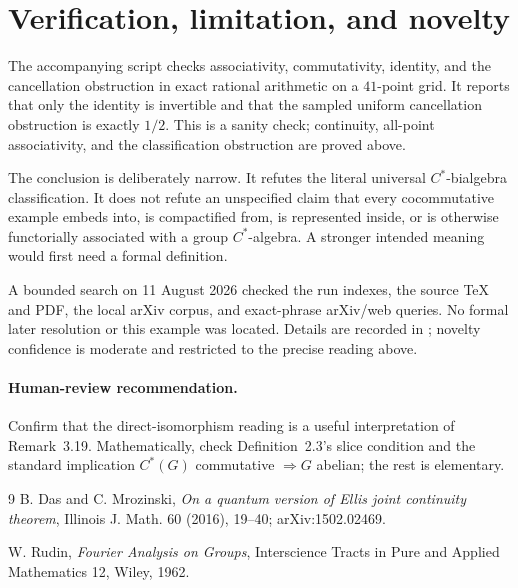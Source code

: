 \documentclass[11pt]{article}
\begin{document}
\section{Verification, limitation, and novelty}

The accompanying script  checks
associativity, commutativity, identity, and the cancellation obstruction in
exact rational arithmetic on a $41$-point grid.  It reports that only the
identity is invertible and that the sampled uniform cancellation obstruction
is exactly $1/2$.  This is a sanity check; continuity, all-point associativity,
and the classification obstruction are proved above.

The conclusion is deliberately narrow.  It refutes the literal universal
$C^*$-bialgebra classification.  It does not refute an unspecified claim that
every cocommutative example embeds into, is compactified from, is represented
inside, or is otherwise functorially associated with a group $C^*$-algebra.
A stronger intended meaning would first need a formal definition.

A bounded search on 11 August 2026 checked the run indexes, the source TeX and
PDF, the local arXiv corpus, and exact-phrase arXiv/web queries.  No formal
later resolution or this example was located.  Details are recorded in
; novelty confidence is moderate and restricted to
the precise reading above.

\paragraph{Human-review recommendation.}
Confirm that the direct-isomorphism reading is a useful interpretation of
Remark~3.19.  Mathematically, check Definition~2.3's slice condition and the
standard implication $C^*(G)$ commutative $\Rightarrow G$ abelian; the rest is
elementary.

\begin{thebibliography}{9}
B. Das and C. Mrozinski,
\emph{On a quantum version of Ellis joint continuity theorem},
Illinois J. Math. 60 (2016), 19--40; arXiv:1502.02469.

W. Rudin,
\emph{Fourier Analysis on Groups},
Interscience Tracts in Pure and Applied Mathematics 12, Wiley, 1962.
\end{thebibliography}
\end{document}
